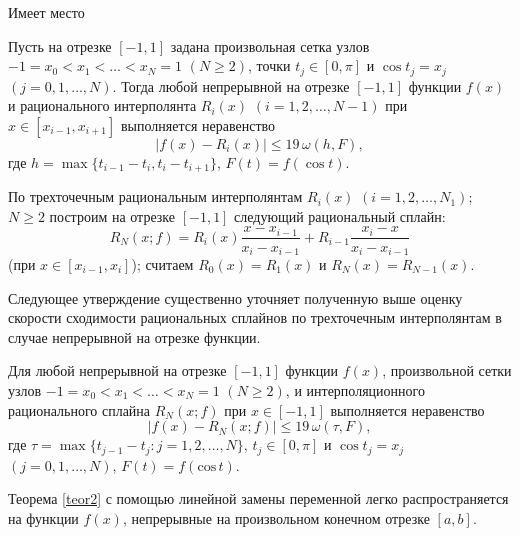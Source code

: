 Имеет место

\begin{theorem}\label{teor1}  Пусть на отрезке $[-1,1]$ задана произвольная сетка узлов
$ -1=x_0<x_1<\dots<x_N=1$  $(N \geqslant 2)$,
точки $t_j\in[0,\pi]$ и $\cos t_j=x_j$ $(j=0,1,\dots, N)$. Тогда
любой непрерывной на отрезке $[-1, 1]$ функции $f(x)$
и рационального интерполянта $R_i(x)$ $(i=1,2, \dots, N-1)$  при $x\in [x_{i-1},x_{i+1}]$
 выполняется неравенство
$$
|f(x)-R_i(x)|\leqslant 19\, \omega(h, F),
$$
где $h=\max\{t_{i-1}-t_i, t_i-t_{i+1}\}$, $F(t)=f(\cos t)$.
\end{theorem}

По трехточечным рациональным интерполянтам $R_i(x)$ $(i=1,2,\dots, N_1)$; $N\geqslant 2$
построим на отрезке $[-1,1]$ следующий рациональный сплайн:
$$
R_N(x; f)=R_i (x)\frac{x-x_{i-1}}{x_i-x_{i-1}}+R_{i-1}\frac{x_i-x}{x_i-x_{i-1}}
$$
(при $x\in [x_{i-1}, x_i]$); считаем $R_0(x)=R_1(x)$ и $R_N (x)=R_{N-1} (x)$.


Следующее утверждение существенно уточняет полученную выше оценку скорости сходимости
рациональных сплайнов по трехточечным интерполянтам в случае непрерывной на отрезке функции.

\begin{theorem}\label{teor2}   Для любой непрерывной на отрезке $[-1,1]$
функции $f(x)$, произвольной сетки узлов $ -1=x_0<x_1<\dots<x_N=1$  $(N \geqslant 2)$,
и интерполяционного рационального сплайна $R_N(x;f)$ при $x\in [-1,1]$ выполняется неравенство
$$
|f(x)-R_N(x;f)|\leqslant 19\, \omega(\tau, F),
$$
где $\tau=\max\{t_{j-1}-t_j: j=1,2,\dots, N\}$, $t_j\in [0,\pi]$ и $\cos t_j=x_j$ $(j=0,1,\dots, N)$,
$F(t)=f(\text{cos}\, t)$.

\end{theorem}

Теорема \ref{teor2} с помощью линейной замены переменной легко распространяется на функции $f(x)$,
непрерывные на произвольном конечном отрезке $[a,b]$.










